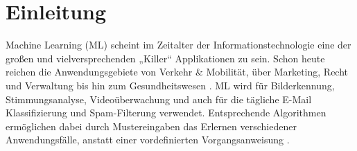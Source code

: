 
\section{Einleitung}
\label{sec:intro}
Machine Learning (ML) scheint im Zeitalter der Informationstechnologie eine der großen und vielversprechenden „Killer“ Applikationen zu sein. Schon heute reichen die Anwendungsgebiete von Verkehr $\&$ Mobilität, über Marketing, Recht und Verwaltung bis hin zum Gesundheitswesen \cite{opportunitieschallenges1}. ML wird für Bilderkennung, Stimmungsanalyse, Videoüberwachung und auch für die tägliche E-Mail Klassifizierung und Spam-Filterung verwendet. Entsprechende Algorithmen ermöglichen dabei durch Mustereingaben das Erlernen verschiedener Anwendungsfälle, anstatt einer vordefinierten Vorgangsanweisung \cite{quantummethodssupervised1}. \\

